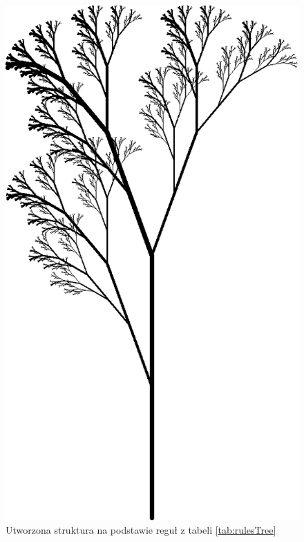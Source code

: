 \documentclass[a4paper,twoside,12pt]{report}
\begin{document}
\begin{figure}[H]
	\centering
	\includegraphics[scale=0.8]{grafika/treeExample}
	\caption{Utworzona struktura na podstawie reguł z tabeli \ref{tab:rulesTree}}
	\label{fig:treeExample}
\end{figure}


\end{document}
